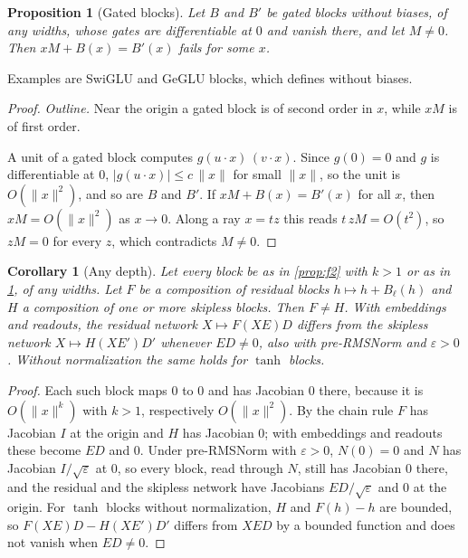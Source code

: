 \documentclass[10pt]{article}
\newtheorem{proposition}[theorem]{Proposition}
\newtheorem{corollary}[theorem]{Corollary}
\theoremstyle{definition}
\theoremstyle{remark}
\newcommand{\norm}[1]{\lVert #1\rVert}
\begin{document}
\begin{proposition}[Gated blocks]\label{prop:gated}
Let $B$ and $B'$ be gated blocks without biases, of any widths, whose gates are differentiable at $0$ and vanish there, and let $M \neq 0$. Then $xM + B(x) = B'(x)$ fails for some $x$.
\end{proposition}
Examples are SwiGLU and GeGLU blocks, which \citet{shazeer2020glu} defines without biases.
\begin{proof}
\emph{Outline.} Near the origin a gated block is of second order in $x$, while $xM$ is of first order.

A unit of a gated block computes $g(u\cdot x)\,(v\cdot x)$. Since $g(0) = 0$ and $g$ is differentiable at $0$, $\lvert g(u\cdot x)\rvert \le c\,\norm{x}$ for small $\norm{x}$, so the unit is $O(\norm{x}^2)$, and so are $B$ and $B'$. If $xM + B(x) = B'(x)$ for all $x$, then $xM = O(\norm{x}^2)$ as $x \to 0$. Along a ray $x = tz$ this reads $t\,zM = O(t^2)$, so $zM = 0$ for every $z$, which contradicts $M \neq 0$.
\end{proof}

\begin{corollary}[Any depth]\label{cor:depth}
Let every block be as in \cref{prop:f2} with $k > 1$ or as in \cref{prop:gated}, of any widths. Let $F$ be a composition of residual blocks $h \mapsto h + B_\ell(h)$ and $H$ a composition of one or more skipless blocks. Then $F \neq H$. With embeddings and readouts, the residual network $X \mapsto F(XE)D$ differs from the skipless network $X \mapsto H(XE')D'$ whenever $ED \neq 0$, also with pre-RMSNorm and $\varepsilon > 0$. Without normalization the same holds for $\tanh$ blocks.
\end{corollary}
\begin{proof}
Each such block maps $0$ to $0$ and has Jacobian $0$ there, because it is $O(\norm{x}^k)$ with $k > 1$, respectively $O(\norm{x}^2)$. By the chain rule $F$ has Jacobian $I$ at the origin and $H$ has Jacobian $0$; with embeddings and readouts these become $ED$ and $0$. Under pre-RMSNorm with $\varepsilon > 0$, $N(0) = 0$ and $N$ has Jacobian $I/\sqrt{\varepsilon}$ at $0$, so every block, read through $N$, still has Jacobian $0$ there, and the residual and the skipless network have Jacobians $ED/\sqrt{\varepsilon}$ and $0$ at the origin. For $\tanh$ blocks without normalization, $H$ and $F(h) - h$ are bounded, so $F(XE)D - H(XE')D'$ differs from $XED$ by a bounded function and does not vanish when $ED \neq 0$.
\end{proof}
\end{document}
